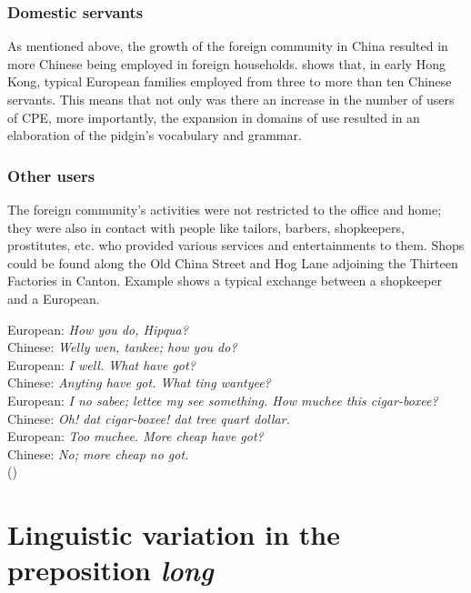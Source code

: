 \documentclass[english,output=paper,colorlinks,citecolor=brown]{../langscibook}
\begin{document}
\subsubsection{Domestic servants}\label{sec:7:4.2.3}

As mentioned above, the growth of the foreign community in China resulted in more Chinese being employed in foreign households. \citet[309]{Zhang2009} shows that, in early Hong Kong, typical European families employed from three to more than ten Chinese servants. This means that not only was there an increase in the number of users of CPE, more importantly, the expansion in domains of use resulted in an elaboration of the pidgin’s vocabulary and grammar.

\subsubsection{Other users}\label{sec:7:4.2.4}

The foreign community’s activities were not restricted to the office and home; they were also in contact with people like tailors, barbers, shopkeepers, prostitutes, etc. who provided various services and entertainments to them. Shops could be found along the Old China Street and Hog Lane adjoining the Thirteen Factories in Canton. Example  shows a typical exchange between a shopkeeper and a European.

\ea
    \label{ex:7:4}
European: \textit{How you do, Hipqua?}\\
Chinese:  \textit{Welly wen, tankee; how you do?}\\
European: \textit{I well. What have got?}\\
Chinese:  \textit{Anyting have got. What ting wantyee?}\\
European: \textit{I no sabee; lettee my see something. How muchee this cigar-boxee?}\\
Chinese:  \textit{Oh! dat cigar-boxee! dat tree quart dollar.}\\
European: \textit{Too muchee. More cheap have got?}\\
Chinese:  \textit{No; more cheap no got.}\\

(\citealt[301]{Duer1860})
\z

\section{Linguistic variation in the preposition \textit{long}}\label{sec:7:5}
\end{document}

